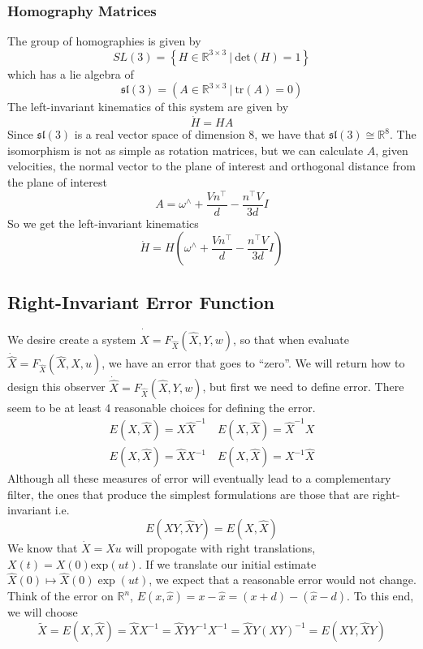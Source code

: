 \documentclass[a4paper]{article}
\begin{document}
\subsubsection*{Homography Matrices}%
The group of homographies is given by
\[
  SL(3) = \left\{ H \in \mathds{R}^{3 \times 3} \ |\  \text{det}(H) = 1 \right\}
\]
which has a lie algebra of
\[
  \mathfrak{sl}(3) = \left( A \in \mathds{R}^{3 \times 3} \ |\ \text{tr}(A) = 0\right)
\]
The left-invariant kinematics of this system are given by
\[
  \dot{H} = HA
\]
Since $\mathfrak{sl}(3)$ is a real vector space of dimension 8, we have that $\mathfrak{sl}(3) \cong \mathds{R}^8$. The isomorphism is not as simple as rotation matrices, but we can calculate $A$, given velocities, the normal vector to the plane of interest and orthogonal distance from the plane of interest
\[
  A =  \omega^{\wedge} + \frac{Vn^{\top}}{d} - \frac{n^\top V}{3d} I
\]
So we get the left-invariant kinematics
\[
  \dot{H} = H\left(\omega^{\wedge} + \frac{Vn^{\top}}{d} - \frac{n^\top V}{3d}I \right)
\]

\subsection*{Right-Invariant Error Function}%
We desire create a system $\dot{\hat{X}} = F_{\hat{X}}(\hat{X}, Y, w)$, so that when evaluate $\dot{\hat{X}} = F_{\hat{X}}(\hat{X}, X, u)$, we have an error that goes to ``zero''. We will return how to design this observer $\dot{\hat{X}} = F_{\hat{X}}(\hat{X}, Y,w)$, but first we need to define error. There seem to be at least 4 reasonable choices for defining the error.
\[
  \begin{aligned}
    E(X,\hat{X}) = X\hat{X}^{-1} \quad E(X, \hat{X}) = \hat{X}^{-1}X \\
    E(X, \hat{X}) = \hat{X}X^{-1} \quad E(X, \hat{X}) = X^{-1}\hat{X}
  \end{aligned}
\]
Although all these measures of error will eventually lead to a complementary filter, the ones that produce the simplest formulations are those that are right-invariant i.e.
\[
  E(XY, \hat{X}Y) = E(X, \hat{X})
\]
We know that $\dot{X} = Xu$ will propogate with right translations, $X(t) = X(0) \text{exp}\left( u t \right)$. If we translate our initial estimate $\hat{X}(0) \mapsto \hat{X}(0)\exp(ut)$, we expect that a reasonable error would not change. Think of the error on $\mathds{R}^n$, $E(x,\hat{x}) = x - \hat{x} = (x + d) - (\hat{x} - d)$. To this end, we will choose
\[
  \tilde{X} = E(X, \hat{X}) = \hat{X}X^{-1} = \hat{X}YY^{-1}X^{-1} = \hat{X}Y(XY)^{-1} = E(XY, \hat{X}Y)
\]
\end{document}
